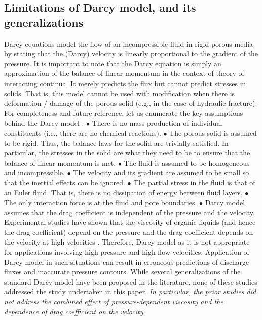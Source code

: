 \documentclass[11pt,reqno]{amsart}
\begin{document}
\subsection{Limitations of Darcy model, and its generalizations}
Darcy equations model the flow of an incompressible 
fluid in rigid porous media by stating that the 
(Darcy) velocity is linearly proportional to the 
gradient of the pressure. 
It is important to note that the Darcy equation is 
simply an approximation of the balance of linear 
momentum in the context of theory of interacting 
continua. It merely predicts the flux but cannot 
predict stresses in solids. That is, this model 
cannot be used with modification when there is 
deformation / damage of the porous solid (e.g., 
in the case of hydraulic fracture). For completeness 
and future reference, let us enumerate the key 
assumptions behind the Darcy model 
\cite{Nakshatrala_Rajagopal_IJNMF_2011_v67_p342}. 
$\bullet$ There is no mass production of individual 
constituents (i.e., there are no chemical reactions). 
$\bullet$ The porous solid is assumed to be rigid. 
Thus, the balance laws for the solid are 
trivially satisfied. In particular, the 
stresses in the solid are what they need 
to be to ensure that the balance of linear 
momentum is met. 
$\bullet$ The fluid is assumed to be homogeneous 
and incompressible.
$\bullet$ The velocity and its gradient are 
assumed to be small so that the inertial 
effects can be ignored.
$\bullet$ The partial stress in the fluid is 
that of an Euler fluid. That is, there is no 
dissipation of energy between fluid layers.
$\bullet$ The only interaction force is at 
the fluid and pore boundaries.
$\bullet$ Darcy model assumes that the drag 
coefficient is independent of the pressure 
and the velocity. 
Experimental studies have shown that the 
viscosity of organic liquids (and hence the 
drag coefficient) depend on the pressure 
\cite{Bridgman,CarlBarus} and the drag 
coefficient depends on the velocity at 
high velocities \cite{Forchheimer_1901_v45_p1782,JacobBear}. 
Therefore, Darcy model as it is not appropriate 
for applications involving high pressure and 
high flow velocities. Application of Darcy 
model in such situations can result in 
erroneous predictions of discharge fluxes 
and inaccurate pressure contours. 
While several generalizations of the standard Darcy 
model have been proposed in the literature, none of 
these studies addressed the study undertaken in this 
paper. \emph{In particular, the prior studies did not 
address the combined effect of pressure-dependent 
viscosity and the dependence of drag coefficient 
on the velocity}. 
\end{document}
